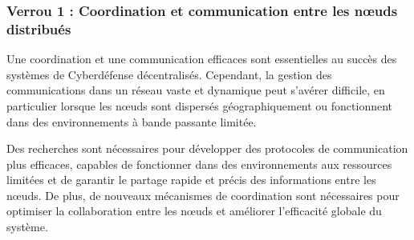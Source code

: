



\subsubsection{Verrou 1 : Coordination et communication entre les nœuds distribués}

Une coordination et une communication efficaces sont essentielles au succès des systèmes de Cyberdéfense décentralisés. Cependant, la gestion des communications dans un réseau vaste et dynamique peut s'avérer difficile, en particulier lorsque les nœuds sont dispersés géographiquement ou fonctionnent dans des environnements à bande passante limitée.

Des recherches sont nécessaires pour développer des protocoles de communication plus efficaces, capables de fonctionner dans des environnements aux ressources limitées et de garantir le partage rapide et précis des informations entre les nœuds. De plus, de nouveaux mécanismes de coordination sont nécessaires pour optimiser la collaboration entre les nœuds et améliorer l'efficacité globale du système.

